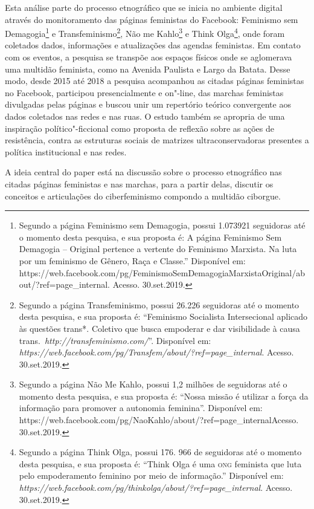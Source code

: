 Esta análise parte do processo etnográfico que se inicia no ambiente
digital através do monitoramento das páginas feministas do Facebook:
Feminismo sem Demagogia\footnote{Segundo a página Feminismo sem
  Demagogia, possui 1.073921 seguidoras até o momento
  desta pesquisa, e sua proposta é: A página Feminismo Sem Demagogia --
  Original pertence a vertente do Feminismo Marxista. Na luta por um
  feminismo de Gênero, Raça e Classe.''
  Disponível em:
  https://web.facebook.com/pg/FeminismoSemDemagogiaMarxistaOriginal/about/?ref=page\_internal.
  Acesso. 30.set.2019.} e Transfeminismo\footnote{Segundo a página
  Transfeminismo, possui 26.226 seguidoras até o momento desta pesquisa,
  e sua proposta é: ``Feminismo Socialista Intersecional aplicado às
  questões trans*. Coletivo que busca empoderar e dar visibilidade à
  causa
  trans.~\emph{http://transfeminismo.com/}''.
  Disponível em:
  \emph{https://web.facebook.com/pg/Transfem/about/?ref=page\_internal}.
  Acesso. 30.set.2019.}, Não me Kahlo\footnote{Segundo a página Não Me
  Kahlo, possui 1,2 milhões de seguidoras até o momento desta pesquisa,
  e sua proposta é: ``Nossa missão é utilizar a força da informação para
  promover a autonomia feminina''. Disponível em:
  https://web.facebook.com/pg/NaoKahlo/about/?ref=page\_internalAcesso.
  30.set.2019.} e Think Olga\footnote{Segundo a página Think Olga,
  possui 176. 966 de seguidoras até o momento desta pesquisa, e sua
  proposta é: ``Think Olga é uma \textsc{ong} feminista que luta pelo
  empoderamento feminino por meio de informação.''
  Disponível em:
  \emph{https://web.facebook.com/pg/thinkolga/about/?ref=page\_internal}.
  Acesso. 30.set.2019.}, onde foram coletados dados, informações e atualizações
das agendas feministas. Em contato com os eventos, a pesquisa se
transpõe aos espaços físicos onde se aglomerava uma multidão feminista,
como na Avenida Paulista e Largo da Batata. Desse modo, desde 2015 até
2018 a pesquisa acompanhou as citadas páginas feministas no Facebook,
participou presencialmente e on"-line, das marchas feministas divulgadas
pelas páginas e buscou unir um repertório teórico convergente aos dados
coletados nas redes e nas ruas. O estudo também se apropria de uma
inspiração político"-ficcional como proposta de reflexão sobre as ações
de resistência, contra as estruturas sociais de matrizes
ultraconservadoras presentes a política institucional e nas redes.

A ideia central do paper está na discussão sobre o processo etnográfico
nas citadas páginas feministas e nas marchas, para a partir delas,
discutir os conceitos e articulações do ciberfeminismo compondo a
multidão ciborgue.

